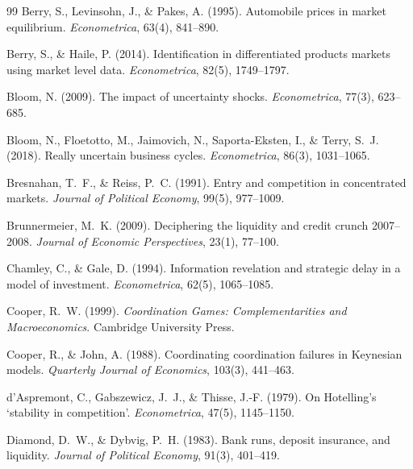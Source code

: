 \documentclass[11pt]{article}
\begin{document}
\begin{thebibliography}{99}
Berry, S., Levinsohn, J., \& Pakes, A. (1995).
\newblock Automobile prices in market equilibrium.
\newblock \emph{Econometrica}, 63(4), 841--890.

Berry, S., \& Haile, P. (2014).
\newblock Identification in differentiated products markets using market level data.
\newblock \emph{Econometrica}, 82(5), 1749--1797.

Bloom, N. (2009).
\newblock The impact of uncertainty shocks.
\newblock \emph{Econometrica}, 77(3), 623--685.

Bloom, N., Floetotto, M., Jaimovich, N., Saporta-Eksten, I., \& Terry, S.~J. (2018).
\newblock Really uncertain business cycles.
\newblock \emph{Econometrica}, 86(3), 1031--1065.

Bresnahan, T.~F., \& Reiss, P.~C. (1991).
\newblock Entry and competition in concentrated markets.
\newblock \emph{Journal of Political Economy}, 99(5), 977--1009.

Brunnermeier, M.~K. (2009).
\newblock Deciphering the liquidity and credit crunch 2007--2008.
\newblock \emph{Journal of Economic Perspectives}, 23(1), 77--100.

Chamley, C., \& Gale, D. (1994).
\newblock Information revelation and strategic delay in a model of investment.
\newblock \emph{Econometrica}, 62(5), 1065--1085.

Cooper, R.~W. (1999).
\newblock \emph{Coordination Games: Complementarities and Macroeconomics}.
\newblock Cambridge University Press.

Cooper, R., \& John, A. (1988).
\newblock Coordinating coordination failures in Keynesian models.
\newblock \emph{Quarterly Journal of Economics}, 103(3), 441--463.

d'Aspremont, C., Gabszewicz, J.~J., \& Thisse, J.-F. (1979).
\newblock On Hotelling's `stability in competition'.
\newblock \emph{Econometrica}, 47(5), 1145--1150.

Diamond, D.~W., \& Dybvig, P.~H. (1983).
\newblock Bank runs, deposit insurance, and liquidity.
\newblock \emph{Journal of Political Economy}, 91(3), 401--419.


\end{thebibliography}
\end{document}
